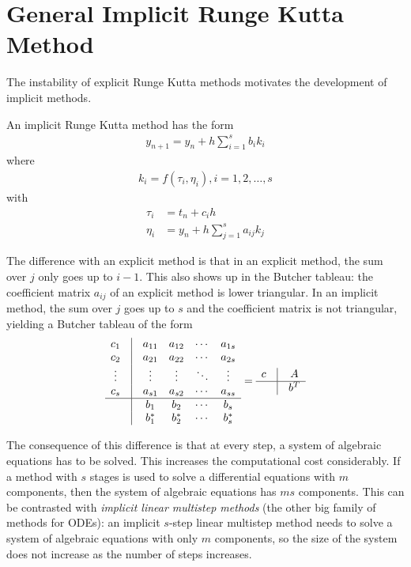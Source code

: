 \documentclass[a4paper,oneside]{book}
\numberwithin{equation}{chapter}
\begin{document}
\section{General Implicit Runge Kutta Method}
The instability of explicit Runge Kutta methods motivates the development of implicit methods.

An implicit Runge Kutta method has the form
\begin{align}
\label{6.1}
{{y_{n + 1}}} = {{y_n}} + h\sum\limits_{i = 1}^s {{b_i}{k_i}} 
\end{align}
where 
\begin{align}
\label{6.2}
{k_i} = f\left( {{\tau _i},{\eta _i}} \right),i = 1,2, \ldots ,s
\end{align}
with 
\begin{align}
{\tau _i} &= {t_n} + {c_i}h\\
{\eta _i} &= {y_n} + h\sum\limits_{j = 1}^s {{a_{ij}}{k_j}} 
\end{align}

The difference with an explicit method is that in an explicit method, the sum over $j$ only goes up to $i-1$. This also shows up in the Butcher tableau: the coefficient matrix $a_{ij}$ of an explicit method is lower triangular. In an implicit method, the sum over $j$ goes up to $s$ and the coefficient matrix is not triangular, yielding a Butcher tableau of the form
\begin{align}
\label{6.3}
\begin{array}{*{20}{c}}
{{c_1}}&\vline& {{a_{11}}}&{{a_{12}}}& \cdots &{{a_{1s}}}\\
{{c_2}}&\vline& {{a_{21}}}&{{a_{22}}}& \cdots &{{a_{2s}}}\\
 \vdots &\vline&  \vdots & \vdots & \ddots & \vdots \\
{{c_s}}&\vline& {{a_{s1}}}&{{a_{s2}}}& \cdots &{{a_{ss}}}\\
\hline
{}&\vline& {{b_1}}&{{b_2}}& \cdots &{{b_s}}\\
{}&\vline& {b_1^*}&{b_2^*}& \cdots &{b_s^*}
\end{array} = \begin{array}{*{20}{c}}
c&\vline& A\\
\hline
{}&\vline& {{b^T}}
\end{array}
\end{align}

The consequence of this difference is that at every step, a system of algebraic equations has to be solved. This increases the computational cost considerably. If a method with $s$ stages is used to solve a differential equations with $m$ components, then the system of algebraic equations has $ms$ components. This can be contrasted with \textit{implicit linear multistep methods} (the other big family of methods for ODEs): an implicit $s$-step linear multistep method needs to solve a system of algebraic equations with only $m$ components, so the size of the system does not increase as the number of steps increases.
\end{document}
